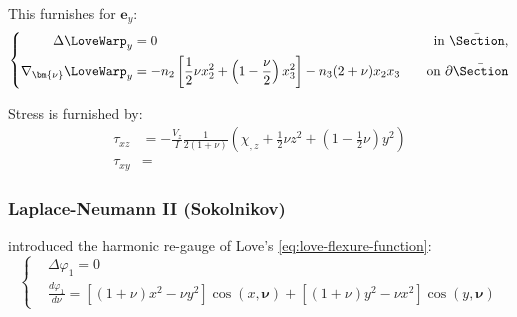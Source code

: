 

This furnishes for \(\mathbf{e}_y\):
\begin{equation*}
\left\{
\begin{aligned}
\Delta \LoveWarp_y &= 0 \quad  &\text{in } \bar{\Section}, \\
\nabla_{\bm{\nu}}\LoveWarp_y &=-n_2\left[\frac{1}{2} \nu x_2^2+\left(1-\frac{\nu}{2}\right) x_3^2\right]-n_3(2+\nu) x_2 x_3
\quad&\text{on } \partial \bar{\Section}
\end{aligned}
\right.
\label{eq:love-flexure-2}
\end{equation*}

Stress is furnished by:
\begin{equation*}
\begin{aligned}
\tau_{xz} &= -\frac{V_z}{I}\frac{1}{2(1+\nu)}\left(
\chi_{,z} + \frac{1}{2}\nu z^2 + (1 - \tfrac{1}{2}\nu) y^2
\right) \\
\tau_{xy} &=
\end{aligned}
\end{equation*}
%

\subsubsection{Laplace-Neumann II (Sokolnikov)}
\cite{sokolnikoffMathematicalTheoryElasticity1946} introduced the harmonic re-gauge of Love's \cref{eq:love-flexure-function}:
\begin{equation}
\left\{
\begin{aligned} 
& \Delta \varphi_1 = 0\\
& \frac{d \varphi_1}{d \nu}=\left[(1+\nu) x^2-\nu y^2\right] \cos (x, \bm{\nu}) 
+\left[(1+\nu) y^2-\nu x^2\right] \cos (y, \bm{\nu})
\end{aligned}
\right.
\end{equation}


